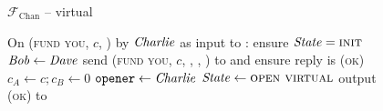 \begin{figure}[H]
  \begin{systembox}{$\mathcal{F}_{\mathrm{Chan}}$ -- virtual}
    \begin{algorithmic}[1]
      \State On (\textsc{fund you}, $c$, \dave) by $\mathit{Charlie}$ as input to
      \alice: 
      \label{code:functionality:chan:skeleton:virtual:fund-you}
      \Indent
        \State ensure $\mathit{State} = \textsc{init}$
        \State $\mathit{Bob} \gets \mathit{Dave}$
        \State send (\textsc{fund you}, $c$, \bob, \charlie, \alice) to
        \adversary and ensure reply is \textsc{(ok)}
        \label{code:functionality:chan:skeleton:virtual:inform}
        \State $c_A \gets c; c_B \gets 0$
        \State $\mathtt{opener} \gets \mathit{Charlie}$
        \State $\mathit{State} \gets \textsc{open virtual}$
        \State output (\textsc{ok}) to \charlie
      \EndIndent
      \Statex


\end{algorithmic}
\end{systembox}
\end{figure}
